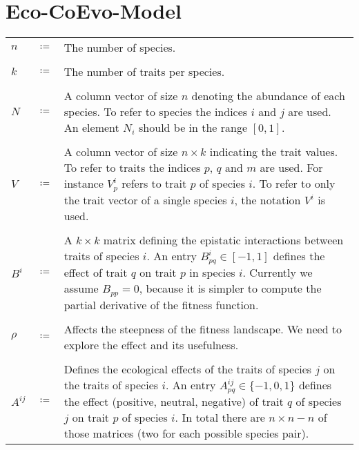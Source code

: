 \documentclass[
12.5pt, 					%
a4paper, 				%
oneside,					%
headinclude,footinclude, %
BCOR5mm, 				%
abstract=on
]{scrreprt}
\numberwithin{equation}{chapter}
\begin{document}
\nobibliography*


\chapter*{Eco-CoEvo-Model}
\vspace{1cm}

\begin{tabular}{l l p{13cm}}
$n$ & $\coloneqq$ & The number of species. \\ \\

$k$ & $\coloneqq$ & The number of traits per species. \\ \\

$N$ & $\coloneqq$ & A column vector of size $n$ denoting the abundance of each species. 
To refer to species the indices $i$ and $j$ are used. An element $N_i$ should be in the range $[0,1]$. \\ \\

$V$ & $\coloneqq$ & A column vector of size $n \times k$ indicating the trait values. To refer to traits the indices $p$, $q$ and $m$ are used. For instance $V_p^i$ refers to trait $p$ of species $i$.
To refer to only the trait vector of a single species $i$, the notation $V^i$ is used. \\\\


$B^i$ & $\coloneqq$ & A $k \times k$ matrix defining the epistatic interactions between traits of species $i$.  An entry $B_{pq}^i \in [-1,1]$ defines the effect of trait $q$ on trait $p$ in species $i$.
Currently we assume $B_{pp}=0$, because it is simpler to compute the partial derivative of the fitness function. \\ \\


$\rho$ & $\coloneqq$  &Affects the steepness of the fitness landscape. We need to explore the effect and its usefulness.\\ \\


$A^{ij}$ &  $\coloneqq$  & Defines the ecological effects of the traits of species $j$ on the traits of species $i$. An entry $A^{ij}_{pq} \in \{-1,0, 1\}$ defines the effect (positive, neutral, negative) of trait $q$ of species $j$ on trait $p$ of species $i$.
In total there are $n \times n - n $ of those matrices (two for each possible species pair).


\end{tabular}
\end{document}
